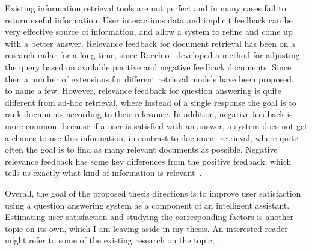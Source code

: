 Existing information retrieval tools are not perfect and in many cases fail to return useful information.
User interactions data and implicit feedback can be very effective source of information, and allow a system to refine and come up with a better answer.
Relevance feedback for document retrieval has been on a research radar for a long time, since Rocchio~\cite{rocchio1971relevance} developed a method for adjusting the query based on available positive and negative feedback documents.
Since then a number of extensions for different retrieval models have been proposed, \eg ~\cite{salton1997improving,lavrenko2001relevance,lv2010positional,hiemstra2001relevance} to name a few.
However, relevance feedback for question answering is quite different from ad-hoc retrieval, where instead of a single response the goal is to rank documents according to their relevance.
In addition, negative feedback is more common, because if a user is satisfied with an answer, a system does not get a chance to use this information, in contrast to document retrieval, where quite often the goal is to find as many relevant documents as possible.
Negative relevance feedback has some key differences from the positive feedback, which tells us exactly what kind of information is relevant~\cite{wang2008study}.

Overall, the goal of the proposed thesis directions is to improve user satisfaction using a question answering system as a component of an intelligent assistant.
Estimating user satisfaction and studying the corresponding factors is another topic on its own, which I am leaving aside in my thesis.
An interested reader might refer to some of the existing research on the topic, \eg \cite{ong2009measurement,Liu:2008:PIS:1390334.1390417,kiseleva2016understanding}.
